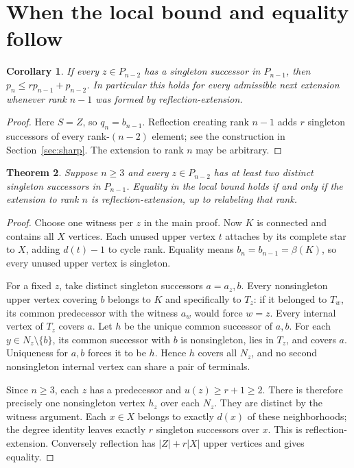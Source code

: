 \documentclass[11pt]{article}
\newtheorem{theorem}{Theorem}[section]
\newtheorem{corollary}[theorem]{Corollary}
\theoremstyle{remark}
\begin{document}
\newpage
\section{When the local bound and equality follow}
\begin{corollary}\label{cor:all}
If every $z\in P_{n-2}$ has a singleton successor in $P_{n-1}$, then
$p_n\le r p_{n-1}+p_{n-2}$. In particular this holds for every admissible next
extension whenever rank $n-1$ was formed by reflection-extension.
\end{corollary}
\begin{proof}
Here $S=Z$, so $q_n=b_{n-1}$. Reflection creating rank $n-1$ adds $r$
singleton successors of every rank-$(n-2)$ element; see the construction in
Section~\ref{sec:sharp}. The extension to rank $n$ may be arbitrary.
\end{proof}

\begin{theorem}\label{thm:equality}
Suppose $n\ge3$ and every $z\in P_{n-2}$ has at least two distinct singleton
successors in $P_{n-1}$. Equality in the local bound holds if and only if the
extension to rank $n$ is reflection-extension, up to relabeling that rank.
\end{theorem}
\begin{proof}
Choose one witness per $z$ in the main proof. Now $K$ is connected and contains
all $X$ vertices. Each unused upper vertex $t$ attaches by its complete star
to $X$, adding $d(t)-1$ to cycle rank. Equality means
$b_n=b_{n-1}=\beta(K)$, so every unused upper vertex is singleton.

For a fixed $z$, take distinct singleton successors $a=a_z,b$.
Every nonsingleton upper vertex covering $b$ belongs to $K$ and specifically
to $T_z$: if it belonged to $T_w$, its common predecessor with the witness
$a_w$ would force $w=z$. Every internal vertex of $T_z$ covers $a$.
Let $h$ be the unique common successor of $a,b$.
For each $y\in N_z\setminus\{b\}$, its common successor with $b$ is
nonsingleton, lies in $T_z$, and covers $a$. Uniqueness for $a,b$ forces it
to be $h$. Hence $h$ covers all $N_z$, and no second nonsingleton internal
vertex can share a pair of terminals.

Since $n\ge3$, each $z$ has a predecessor and $u(z)\ge r+1\ge2$.
There is therefore precisely one nonsingleton vertex $h_z$ over each $N_z$.
They are distinct by the witness argument. Each $x\in X$ belongs to exactly
$d(x)$ of these neighborhoods; the degree identity leaves exactly $r$
singleton successors over $x$. This is reflection-extension.
Conversely reflection has $|Z|+r|X|$ upper vertices and gives equality.
\end{proof}
\end{document}
